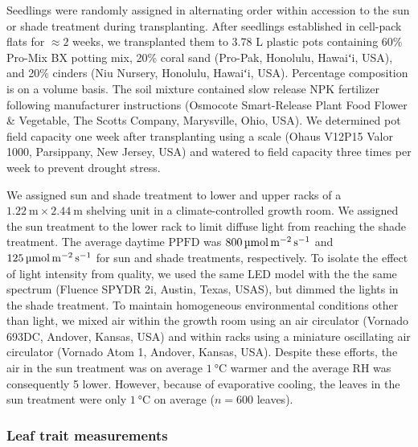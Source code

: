\documentclass[
  letterpaper,
  DIV=11,
  numbers=noendperiod]{scrartcl}
\newcommand{\ppfd}{$\mathrm{PPFD}$}
\newcommand{\ppfdqty}[1]{$\qty{#1}{\micro\mol\raiseto{-2}\meter\raiseto{-1}\second}$}
\begin{document}
Seedlings were randomly assigned in alternating order within accession
to the sun or shade treatment during transplanting. After seedlings
established in cell-pack flats for \(\approx 2\) weeks, we transplanted
them to 3.78 L plastic pots containing 60\% Pro-Mix BX potting mix, 20\%
coral sand (Pro-Pak, Honolulu, Hawaiʻi, USA), and 20\% cinders (Niu
Nursery, Honolulu, Hawaiʻi, USA). Percentage composition is on a volume
basis. The soil mixture contained slow release NPK fertilizer following
manufacturer instructions (Osmocote Smart-Release Plant Food Flower \&
Vegetable, The Scotts Company, Marysville, Ohio, USA). We determined pot
field capacity one week after transplanting using a scale (Ohaus V12P15
Valor 1000, Parsippany, New Jersey, USA) and watered to field capacity
three times per week to prevent drought stress.

We assigned sun and shade treatment to lower and upper racks of a
\(\qty{1.22}{\meter} \times \qty{2.44}{\meter}\) shelving unit in a
climate-controlled growth room. We assigned the sun treatment to the
lower rack to limit diffuse light from reaching the shade treatment. The
average daytime \ppfd{} was \ppfdqty{800} and \ppfdqty{125} for sun and
shade treatments, respectively. To isolate the effect of light intensity
from quality, we used the same LED model with the the same spectrum
(Fluence SPYDR 2i, Austin, Texas, USAS), but dimmed the lights in the
shade treatment. To maintain homogeneous environmental conditions other
than light, we mixed air within the growth room using an air circulator
(Vornado 693DC, Andover, Kansas, USA) and within racks using a miniature
oscillating air circulator (Vornado Atom 1, Andover, Kansas, USA).
Despite these efforts, the air in the sun treatment was on average
\(\qty{1}{\degreeCelsius}\) warmer and the average RH was consequently 5
lower. However, because of evaporative cooling, the leaves in the sun
treatment were only \(\qty{1}{\degreeCelsius}\) on average (\(n = 600\)
leaves).

\subsubsection{Leaf trait measurements}\label{leaf-trait-measurements}
\end{document}
